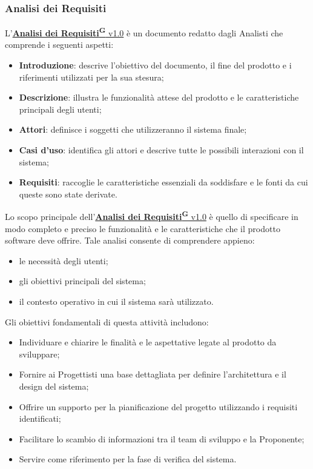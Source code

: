 \subsubsection{Analisi dei Requisiti}

L'\href{https://code7crusaders.github.io/docs/RTB/documentazione_interna/glossario.html#analisi-dei-requisiti}{\textbf{Analisi dei Requisiti\textsuperscript{G}} v1.0} è un documento redatto dagli Analisti che comprende i seguenti aspetti:
\begin{itemize}
    \item \textbf{Introduzione}: descrive l’obiettivo del documento, il fine del prodotto e i riferimenti utilizzati per la sua stesura;
    \item \textbf{Descrizione}: illustra le funzionalità attese del prodotto e le caratteristiche principali degli utenti;
    \item \textbf{Attori}: definisce i soggetti che utilizzeranno il sistema finale;
    \item \textbf{Casi d’uso}: identifica gli attori e descrive tutte le possibili interazioni con il sistema;
    \item \textbf{Requisiti}: raccoglie le caratteristiche essenziali da soddisfare e le fonti da cui queste sono state derivate.
\end{itemize}

Lo scopo principale dell'\href{https://code7crusaders.github.io/docs/RTB/documentazione_interna/glossario.html#analisi-dei-requisiti}{\textbf{Analisi dei Requisiti\textsuperscript{G}} v1.0} è quello di specificare in modo completo e preciso le funzionalità e le caratteristiche che il prodotto software deve offrire. Tale analisi consente di comprendere appieno:
\begin{itemize}
    \item le necessità degli utenti;
    \item gli obiettivi principali del sistema;
    \item il contesto operativo in cui il sistema sarà utilizzato.
\end{itemize}

Gli obiettivi fondamentali di questa attività includono:
\begin{itemize}
    \item Individuare e chiarire le finalità e le aspettative legate al prodotto da sviluppare;
    \item Fornire ai Progettisti una base dettagliata per definire l’architettura e il design del sistema;
    \item Offrire un supporto per la pianificazione del progetto utilizzando i requisiti identificati;
    \item Facilitare lo scambio di informazioni tra il team di sviluppo e la Proponente;
    \item Servire come riferimento per la fase di verifica del sistema.
\end{itemize}


